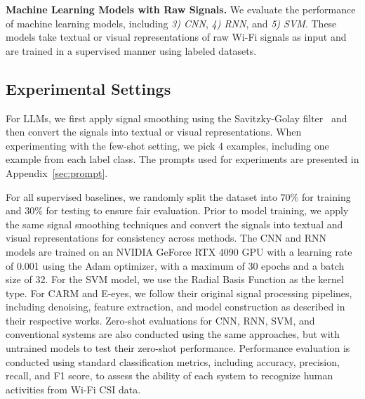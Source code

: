 \textbf{Machine Learning Models with Raw Signals.} 
We evaluate the performance of machine learning models, including \textit{3) CNN}, \textit{4) RNN}, and \textit{5) SVM}. These models take textual or visual representations of raw Wi-Fi signals as input and are trained in a supervised manner using labeled datasets.

\subsection{Experimental Settings}

For LLMs, we first apply signal smoothing using the Savitzky-Golay filter~\cite{schafer2011savitzky} and then convert the signals into textual or visual representations. When experimenting with the few-shot setting, we pick 4 examples, including one example from each label class. The prompts used for experiments are presented in Appendix~\ref{sec:prompt}.


For all supervised baselines, we randomly split the dataset into $70\%$ for training and $30\%$ for testing to ensure fair evaluation. Prior to model training, we apply the same signal smoothing techniques and convert the signals into textual and visual representations for consistency across methods. The CNN and RNN models are trained on an NVIDIA GeForce RTX 4090 GPU with a learning rate of 0.001 using the Adam optimizer, with a maximum of 30 epochs and a batch size of 32. For the SVM model, we use the Radial Basis Function as the kernel type. For CARM and E-eyes, we follow their original signal processing pipelines, including denoising, feature extraction, and model construction as described in their respective works. 
Zero-shot evaluations for CNN, RNN, SVM, and conventional systems are also conducted using the same approaches, but with untrained models to test their zero-shot performance. Performance evaluation is conducted using standard classification metrics, including accuracy, precision, recall, and F1 score, to assess the ability of each system to recognize human activities from Wi-Fi CSI data.

